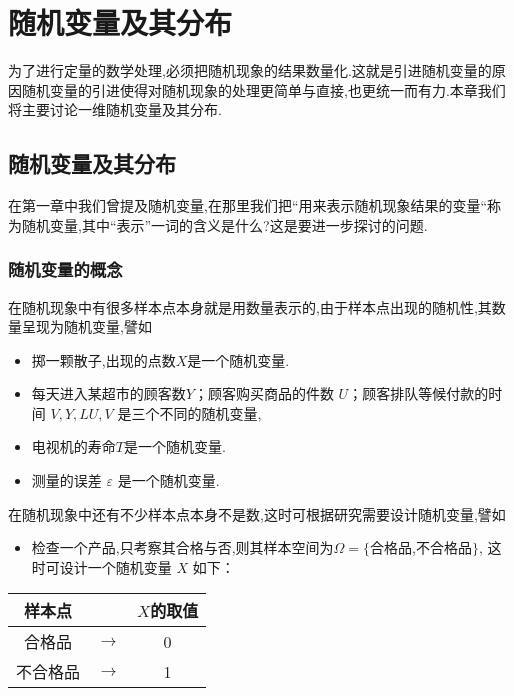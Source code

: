 \setcounter{chapter}{1}
\chapter{随机变量及其分布}

为了进行定量的数学处理,必须把随机现象的结果数量化.这就是引进随机变量的原因随机变量的引进使得对随机现象的处理更简单与直接,也更统一而有力.本章我们将主要讨论一维随机变量及其分布.

\section{随机变量及其分布}

在第一章中我们曾提及随机变量,在那里我们把“用来表示随机现象结果的变量“称为随机变量,其中“表示”一词的含义是什么?这是要进一步探讨的问题.

\subsection{随机变量的概念}

在随机现象中有很多样本点本身就是用数量表示的,由于样本点出现的随机性,其数量呈现为随机变量,譬如

\begin{itemize}
	\item 掷一颗散子,出现的点数$X$是一个随机变量.
	\item 每天进入某超市的顾客数$Y$；顾客购买商品的件数 $U$；顾客排队等候付款的时间 $V,Y,LU,V$ 是三个不同的随机变量,
	\item 电视机的寿命$T$是一个随机变量.
	\item 测量的误差 $\varepsilon $ 是一个随机变量.
\end{itemize}

在随机现象中还有不少样本点本身不是数,这时可根据研究需要设计随机变量,譬如
\begin{itemize}
	\item 检查一个产品,只考察其合格与否,则其样本空间为$\Omega=\{$合格品,不合格品$\}$, 这时可设计一个随机变量 $X$ 如下：
\end{itemize}

\begin{table}[htbp]
	\centering
	\begin{tabular}{ccc}
		样本点   &       & $X$的取值 \\\hline
		合格品   &   $ \longrightarrow $ & 0 \\
		不合格品 &    $ \longrightarrow $ & 1 \\
	\end{tabular}%
\end{table}%

